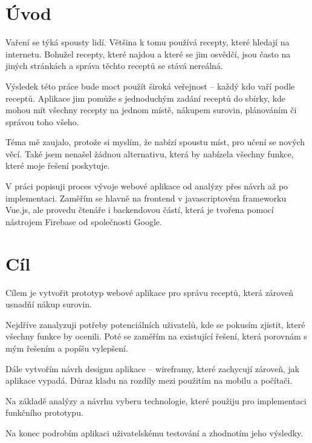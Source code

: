 
\chapter{Úvod}

Vaření se týká spousty lidí. Většina k tomu používá recepty, které hledají na internetu. Bohužel recepty, které najdou
a které se jim osvědčí, jsou často na jiných stránkách a správa těchto receptů se stává nereálná.

Výsledek této práce bude moct použít široká veřejnost -- každý kdo vaří podle receptů. Aplikace jim pomůže s jednoduchým
zadání receptů do sbírky, kde mohou mít všechny recepty na jednom místě, nákupem surovin, plánováním či správou toho všeho.

Téma mě zaujalo, protože si myslím, že nabízí spoustu míst, pro učení se nových věcí. Také jsem nenašel žádnou alternativu,
která by nabízela všechny funkce, které moje řešení poskytuje.

V práci popisuji proces vývoje webové aplikace od analýzy přes návrh až po implementaci. Zaměřím se hlavně na frontend v
javascriptovém frameworku Vue.js, ale provedu čtenáře i backendovou částí, která je tvořena pomocí nástrojem Firebase od
společnosti Google.

\chapter{Cíl}
Cílem je vytvořit prototyp webové aplikace pro správu receptů, která zároveň usnadňí nákup surovin.

Nejdříve zanalyzuji potřeby potenciálních uživatelů, kde se pokusím zjistit, které všechny funkce by ocenili. Poté se
zaměřím na existující řešení, která porovnám s mým řešením a popíšu vylepšení.

Dále vytvořím návrh designu aplikace -- wireframy, které zachycují zároveň, jak aplikace vypadá. Důraz kladu na rozdíly
mezi použitím na mobilu a počítači.

Na základě analýzy a návrhu vyberu technologie, které použiju pro implementaci funkčního prototypu.

Na konec podrobím aplikaci uživatelskému testování a zhodnotím jeho výsledky.
